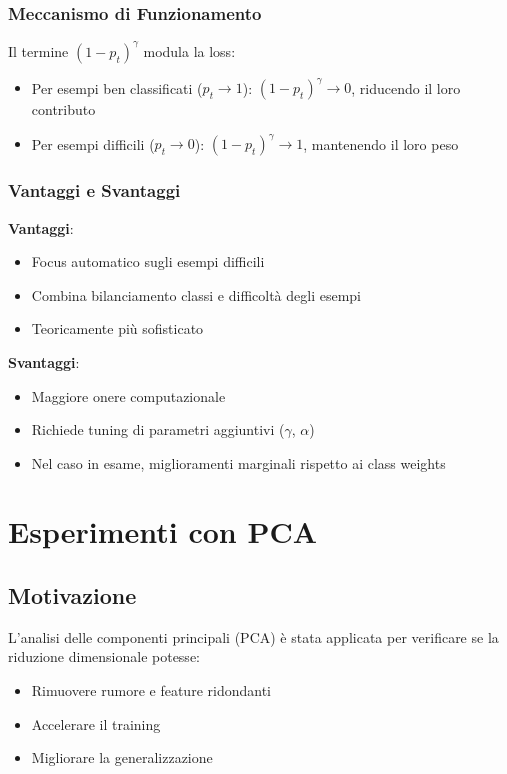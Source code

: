\subsubsection{Meccanismo di Funzionamento}

Il termine $(1 - p_t)^\gamma$ modula la loss:
\begin{itemize}
    \item Per esempi ben classificati ($p_t \rightarrow 1$): $(1 - p_t)^\gamma \rightarrow 0$, riducendo il loro contributo
    \item Per esempi difficili ($p_t \rightarrow 0$): $(1 - p_t)^\gamma \rightarrow 1$, mantenendo il loro peso
\end{itemize}

\subsubsection{Vantaggi e Svantaggi}

\textbf{Vantaggi}:
\begin{itemize}
    \item Focus automatico sugli esempi difficili
    \item Combina bilanciamento classi e difficoltà degli esempi
    \item Teoricamente più sofisticato
\end{itemize}

\textbf{Svantaggi}:
\begin{itemize}
    \item Maggiore onere computazionale
    \item Richiede tuning di parametri aggiuntivi ($\gamma$, $\alpha$)
    \item Nel caso in esame, miglioramenti marginali rispetto ai class weights
\end{itemize}

\section{Esperimenti con PCA}

\subsection{Motivazione}

L'analisi delle componenti principali (PCA) è stata applicata per verificare se la riduzione dimensionale potesse:
\begin{itemize}
    \item Rimuovere rumore e feature ridondanti
    \item Accelerare il training
    \item Migliorare la generalizzazione
\end{itemize}

